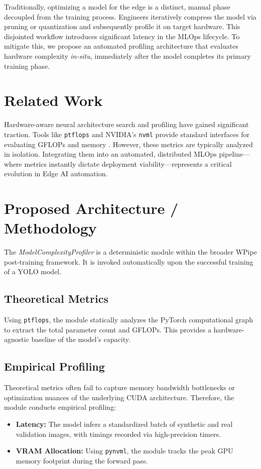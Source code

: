 \documentclass[conference]{IEEEtran}
\begin{document}
Traditionally, optimizing a model for the edge is a distinct, manual phase decoupled from the training process. Engineers iteratively compress the model via pruning or quantization and subsequently profile it on target hardware. This disjointed workflow introduces significant latency in the MLOps lifecycle. To mitigate this, we propose an automated profiling architecture that evaluates hardware complexity \textit{in-situ}, immediately after the model completes its primary training phase.

\section{Related Work}
Hardware-aware neural architecture search and profiling have gained significant traction. Tools like \texttt{ptflops} and NVIDIA's \texttt{nvml} provide standard interfaces for evaluating GFLOPs and memory \cite{dollar2021fast}. However, these metrics are typically analyzed in isolation. Integrating them into an automated, distributed MLOps pipeline—where metrics instantly dictate deployment viability—represents a critical evolution in Edge AI automation.

\section{Proposed Architecture / Methodology}
The \textit{ModelComplexityProfiler} is a deterministic module within the broader WPipe post-training framework. It is invoked automatically upon the successful training of a YOLO model.

\subsection{Theoretical Metrics}
Using \texttt{ptflops}, the module statically analyzes the PyTorch computational graph to extract the total parameter count and GFLOPs. This provides a hardware-agnostic baseline of the model's capacity.

\subsection{Empirical Profiling}
Theoretical metrics often fail to capture memory bandwidth bottlenecks or optimization nuances of the underlying CUDA architecture. Therefore, the module conducts empirical profiling:
\begin{itemize}
    \item \textbf{Latency:} The model infers a standardized batch of synthetic and real validation images, with timings recorded via high-precision timers.
    \item \textbf{VRAM Allocation:} Using \texttt{pynvml}, the module tracks the peak GPU memory footprint during the forward pass.
\end{itemize}
\end{document}
